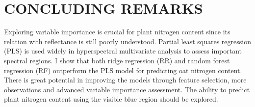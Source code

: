 \documentclass{isprs}
\begin{document}
\section{CONCLUDING REMARKS}
Exploring variable importance is crucial for plant nitrogen content since its relation with reflectance is still poorly understood. Partial least squares regression (PLS) is used widely in hyperspectral multivariate analysis to assess important spectral regions. I show that both ridge regression (RR) and random forest regression (RF) outperform the PLS model for predicting oat nitrogen content. There is great potential in improving the models through feature selection, more observations and advanced variable importance assessment. The ability to predict plant nitrogen content using the visible blue region should be explored.


\nocite{*}
\vspace{4mm}

 

\vspace{1cm}
\end{document}
